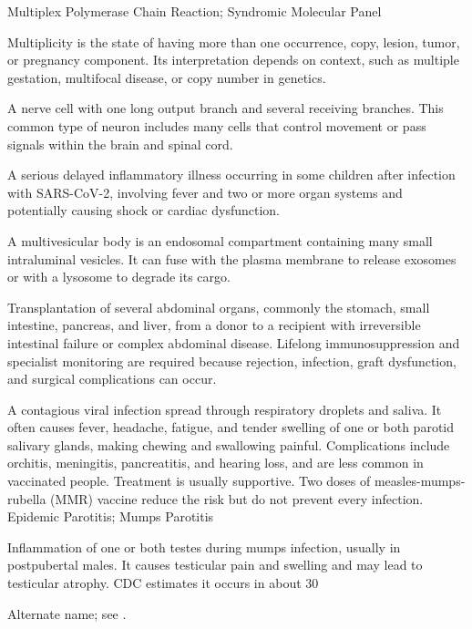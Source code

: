 \synonyms
Multiplex Polymerase Chain Reaction; Syndromic Molecular Panel

 Multiplicity is the state of having more than one occurrence, copy, lesion, tumor, or pregnancy component. Its interpretation depends on context, such as multiple gestation, multifocal disease, or copy number in genetics.

 A nerve cell with one long output branch and several receiving branches. This common type of neuron includes many cells that control movement or pass signals within the brain and spinal cord.

 A serious delayed inflammatory illness occurring in some children after infection with SARS-CoV-2, involving fever and two or more organ systems and potentially causing shock or cardiac dysfunction.

 A multivesicular body is an endosomal compartment containing many small intraluminal vesicles. It can fuse with the plasma membrane to release exosomes or with a lysosome to degrade its cargo.

 Transplantation of several abdominal organs, commonly the stomach, small intestine, pancreas, and liver, from a donor to a recipient with irreversible intestinal failure or complex abdominal disease. Lifelong immunosuppression and specialist monitoring are required because rejection, infection, graft dysfunction, and surgical complications can occur.

 A contagious viral infection spread through respiratory droplets and saliva. It often causes fever, headache, fatigue, and tender swelling of one or both parotid salivary glands, making chewing and swallowing painful. Complications include orchitis, meningitis, pancreatitis, and hearing loss, and are less common in vaccinated people. Treatment is usually supportive. Two doses of measles-mumps-rubella (MMR) vaccine reduce the risk but do not prevent every infection.
\synonyms
Epidemic Parotitis; Mumps Parotitis

 Inflammation of one or both testes during mumps infection, usually in postpubertal males. It causes testicular pain and swelling and may lead to testicular atrophy. CDC estimates it occurs in about 30%

 Alternate name; see .

